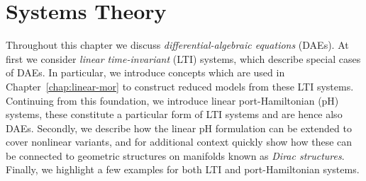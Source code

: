 \chapter{Systems Theory}\label{chap:systems-theory}

Throughout this chapter we discuss \emph{differential-algebraic equations} (DAEs).
At first we consider \emph{linear time-invariant} (LTI) systems, which describe special cases of DAEs.
In particular, we introduce concepts which are used in Chapter~\ref{chap:linear-mor} to construct reduced models from these LTI systems.
Continuing from this foundation, we introduce linear port-Hamiltonian (pH) systems, these constitute a particular form of LTI systems and are hence also DAEs.
Secondly, we describe how the linear pH formulation can be extended to cover nonlinear variants, and for additional context quickly show how these can be connected to geometric structures on manifolds known as \emph{Dirac structures}.
Finally, we highlight a few examples for both LTI and port-Hamiltonian systems.




